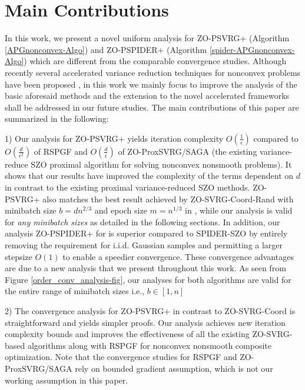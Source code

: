 \documentclass[iicol,sn-basic]{sn-jnl}
\theoremstyle{thmstyleone}%
\theoremstyle{thmstyletwo}%
\theoremstyle{thmstylethree}%
\begin{document}
\section{Main Contributions}
In this work, we present a novel uniform analysis for ZO-PSVRG+ (Algorithm \ref{APGnonconvex-Algo}) and ZO-PSPIDER+ (Algorithm \ref{spider-APGnonconvex-Algo}) which are different from the comparable convergence studies. Although recently several accelerated variance reduction techniques for nonconvex problems have been proposed \cite{wang2019spiderboost}, in this work we mainly focus to improve the analysis of the basic aforesaid methods and the extension to the novel accelerated frameworks shall be addressed in our future studies. 
The main contributions of this paper are summarized in the following:

1) Our analysis for ZO-PSVRG+ yields iteration complexity $O(\frac{1}{{\epsilon}})$ compared to $O(\frac{d}{\epsilon^2})$ of RSPGF \cite{ghadimi2016accelerated}  and $O(\frac{d}{\epsilon})$ of ZO-ProxSVRG/SAGA  \cite{huang2019faster} (the existing variance-reduce SZO proximal algorithm for solving nonconvex nonsmooth problems).  
It shows that our results have improved the complexity of the terms dependent on
$d$ in contrast to the existing proximal variance-reduced SZO methods. ZO-PSVRG+ also matches the best result achieved by ZO-SVRG-Coord-Rand with minibatch size $b = d n^{2/3}$ and epoch size $m = n^{1/3}$ in \cite{ji2019improved}, while our analysis is valid for {\it any minibatch sizes} as detailed in the following sections. In addition, our analysis ZO-PSPIDER+ for is superior compared to SPIDER-SZO \cite{fang2018spider} by entirely removing the requirement for i.i.d. Gaussian samples and permitting a larger stepsize $O(1)$ to enable a speedier convergence. These convergence advantages are due to a new  analysis that we present throughout this work. As seen from Figure \ref{order_conv_analysis-fig}, our analyses for both algorithms are valid for the entire range of minibatch sizes i.e., $b \in [1, n]$

2) The convergence analysis for ZO-PSVRG+ in contrast to  ZO-SVRG-Coord \cite{liu2018zeroth, ji2019improved} is straightforward and yields simpler proofs. Our analysis achieves new iteration complexity bounds and improves the effectiveness of all the existing ZO-SVRG-based algorithms along with RSPGF for nonconvex nonsmooth composite optimization. Note that the convergence studies for RSPGF and ZO-ProxSVRG/SAGA rely on bounded gradient assumption, which is not our working assumption in this paper.
\end{document}
